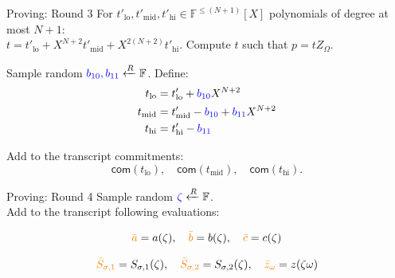 \documentclass{zkdl-presentation-template}
\begin{document}
    \begin{frame} {Proving: Round 3}
        For $t'_{\text{lo}}, t'_{\text{mid}}, t'_{\text{hi}} \in \mathbb{F}^{\leq (N+1)}[X]$ polynomials of degree at most $N+1$: \\
        \vspace{1em}
        $t = t'_{\text{lo}} + X^{N+2}t'_{\text{mid}} + X^{2(N+2)}t'_{\text{hi}}$.
        Compute $t$ such that $p = tZ_{\Omega}$.
        
        Sample random $\textcolor{blue}{b_{10}, b_{11}} \xleftarrow{R} \mathbb{F}$. Define:
        \begin{align*}
            t_{\text{lo}} &= t'_{\text{lo}} + \textcolor{blue}{b_{10}}X^{N+2} \\
            t_{\text{mid}} &= t'_{\text{mid}} - \textcolor{blue}{b_{10}} + \textcolor{blue}{b_{11}}X^{N+2} \\
            t_{\text{hi}} &= t'_{\text{hi}} - \textcolor{blue}{b_{11}}
        \end{align*}

        Add to the transcript commitments: 
        \begin{equation*}
            \mathsf{com}(t_{\text{lo}}), \quad \mathsf{com}(t_{\text{mid}}), \quad \mathsf{com}(t_{\text{hi}}).
        \end{equation*}
    \end{frame}

    \begin{frame} {Proving: Round 4}
        Sample random $\textcolor{blue}{\zeta} \xleftarrow{R} \mathbb{F}$. \\
        \vspace{1em}
        Add to the transcript following evaluations:

        \begin{equation*}
            \textcolor{orange}{\bar{a}} = a(\zeta), \quad \textcolor{orange}{\bar{b}} = b(\zeta), \quad \textcolor{orange}{\bar{c}} = c(\zeta)
        \end{equation*}

        \begin{equation*}
            \textcolor{orange}{\bar{S}_{\sigma,1}} = S_{\sigma,1}(\zeta), \quad \textcolor{orange}{\bar{S}_{\sigma,2}} = S_{\sigma,2}(\zeta), \quad \textcolor{orange}{\bar{z}_{\omega}} = z(\zeta \omega)
        \end{equation*}
    \end{frame}
\end{document}
